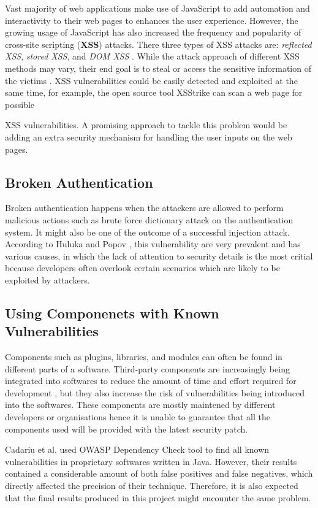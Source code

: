 \documentclass[12pt, a4paper]{report}
\begin{document}
Vast majority of web applications make use of JavaScript to add automation and interactivity to
their web pages to enhances the user experience. However, the growing usage of JavaScript has also
increased the frequency and popularity of cross-site scripting (\textbf{XSS}) attacks. There three
types of XSS attacks are: \textit{reflected XSS}, \textit{stored XSS}, and \textit{DOM XSS}
\cite{kieyzun_2009}. While the attack approach of different XSS methods may vary, their end goal is
to steal or access the sensitive information of the victims \cite{vogt_2007}. XSS vulnerabilities
could be easily detected and exploited at the same time, for example, the open source tool XSStrike
\cite{xsstrike} can scan a web page for possible {XSS vulnerabilities. A promising approach to
tackle this problem would be adding an extra security mechanism for handling the user inputs on the
web pages.

\subsection{Broken Authentication}
Broken authentication happens when the attackers are allowed to perform malicious actions such as
brute force dictionary attack on the authentication system. It might also be one of the outcome of a
successful injection attack. According to Huluka and Popov \cite{huluka_2012}, this vulnerability
are very prevalent and has various causes, in which the lack of attention to security details is the
most critial because developers often overlook certain scenarios which are likely to be exploited by
attackers.

\subsection{Using Componenets with Known Vulnerabilities}
Components such as plugins, libraries, and modules can often be found in different parts of a
software. Third-party components are increasingly being integrated into softwares to reduce the
amount of time and effort required for development \cite{balzarotti_2006}, but they also increase
the risk of vulnerabilities being introduced into the softwares. These components are mostly
maintened by different developers or organisations hence it is unable to guarantee that all the
components used will be provided with the latest security patch.

Cadariu et al. \cite{cadariu_2015} used OWASP Dependency Check tool \cite{owasp_dependency} to find
all known vulnerabilities in proprietary softwares written in Java. However, their results contained
a considerable amount of both false positives and false negatives, which directly affected the
precision of their technique. Therefore, it is also expected that the final results produced in this
project might encounter the same problem.

}
\end{document}
